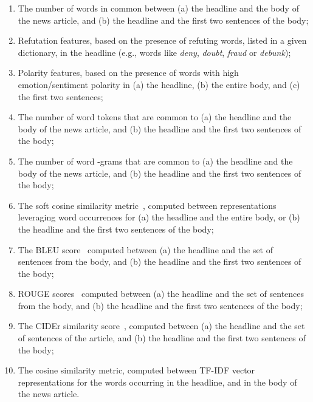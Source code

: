 \begin{enumerate}
\item The number of words in common between (a) the headline and the body of the news article, and (b) the headline and the first two sentences of the body;

\item Refutation features, based on the presence of refuting words, listed in a given dictionary, in the headline (e.g., words like {\it deny}, {\it doubt}, {\it fraud} or {\it debunk});

\item Polarity features, based on the presence of words with high emotion/sentiment polarity in (a) the headline, (b) the entire body, and (c) the first two sentences;

\item The number of word tokens that are common to (a) the headline and the body of the news article, and (b) the headline and the first two sentences of the body;

\item The number of word -grams that are common to (a) the headline and the body of the news article, and (b) the headline and the first two sentences of the body;

\item The soft cosine similarity metric~\cite{charlet2017simbow}, computed between representations leveraging word occurrences for (a) the headline and the entire body, or (b) the headline and the first two sentences of the body;

\item The BLEU score~\cite{bleu} computed between (a) the headline and the set of sentences from the body, and (b) the headline and the first two sentences of the body;

\item ROUGE scores~\cite{rouge} computed between (a) the headline and the set of sentences from the body, and (b) the headline and the first two sentences of the body;

\item The CIDEr similarity score~\cite{cider}, computed between (a) the headline and the set of sentences of the article, and (b) the headline and the first two sentences of the body;

\item The cosine similarity metric, computed between TF-IDF vector representations for the words occurring in the headline, and in the body of the news article.


\end{enumerate}
